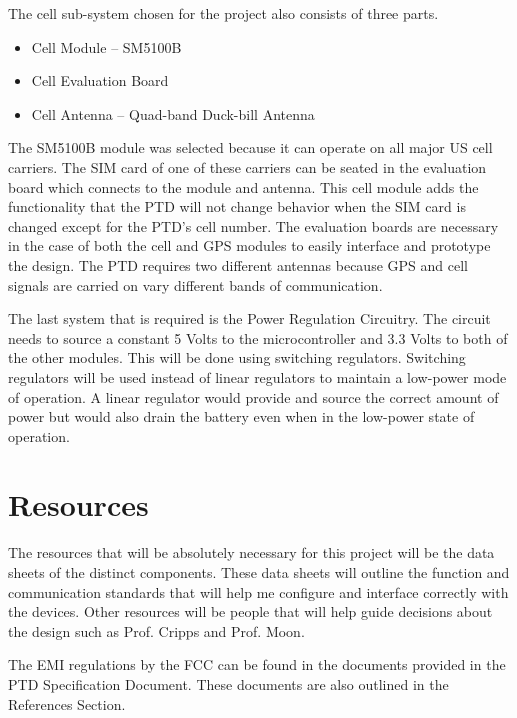 \documentclass[11pt]{article}
\begin{document}
The cell sub-system chosen for the project also consists of three parts.
\begin{itemize}
    \item Cell Module -- SM5100B
    \item Cell Evaluation Board
    \item Cell Antenna -- Quad-band Duck-bill Antenna
\end{itemize}
The SM5100B module was selected because it can operate on all major US cell carriers. The SIM card of one of these carriers can be seated in the evaluation board 
which connects to the module and antenna. This cell module adds the functionality that the PTD will not change behavior when the SIM card is changed except for the PTD's cell number. The evaluation boards are necessary in 
the case of both the cell and GPS modules to easily interface and prototype the design. The PTD requires two different antennas because GPS and cell signals 
are carried on vary different bands of communication.

The last system that is required is the Power Regulation Circuitry. The circuit needs to source a constant 5 Volts to the microcontroller and 3.3 Volts to 
both of the other modules. This will be done using switching regulators. Switching regulators will be used instead of linear regulators to maintain a low-power 
mode of operation. A linear regulator would provide and source the correct amount of power but would also  drain the battery even when in the low-power state 
of operation.


\section{Resources}
The resources that will be absolutely necessary for this project will be the data sheets of the distinct components. These data sheets will outline the 
function and communication standards that will help me configure and interface correctly with the devices. Other resources will be people that will help 
guide decisions about the design such as Prof. Cripps and Prof. Moon.

The EMI regulations by the FCC can be found in the documents provided in the PTD Specification Document. These documents are also outlined in the References 
Section.
\end{document}
